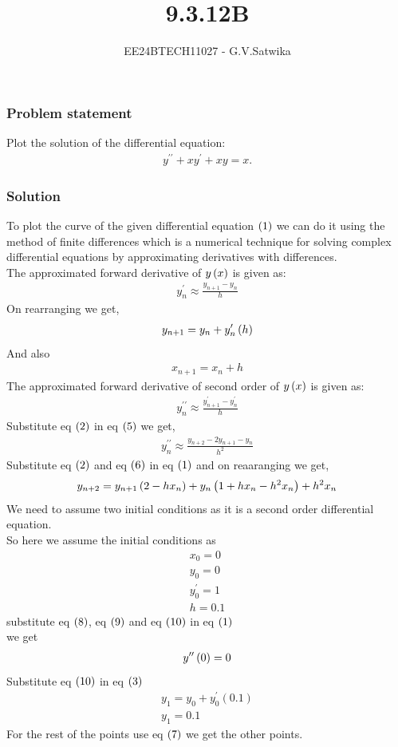 \documentclass{beamer}
\begin{document}
\title{9.3.12B}
\author{EE24BTECH11027 - G.V.Satwika}
\date{}
\frame{\titlepage}

\begin{frame}
\frametitle{Problem statement}
Plot the solution of the differential equation: 
\begin{align}
    y^{\prime\prime} +xy^\prime + xy = x. 
\end{align}
\end{frame}
\begin{frame}[allowframebreaks]
\frametitle{Solution}
To plot the curve of the given differential equation $\left(1\right)$ we can do it using the method of finite differences which is a numerical technique for solving complex differential equations by approximating derivatives with differences.\\
The approximated forward derivative of $y\left(x\right)$ is given as:\\
\begin{align}
    y^\prime_n\approx\frac{y_{n+1}-y_n}{h}
\end{align}
On rearranging we get,
\begin{align}
    y_{n+1}=y_n+y^\prime_n\left(h\right)
\end{align}
And also 
\begin{align}
    x_{n+1}=x_n+h
\end{align}
The approximated forward derivative of second order of $y\left(x\right)$ is given as:\\
\begin{align}
    y^{\prime\prime}_n\approx \frac{y^\prime_{n+1}-y^\prime_n}{h}
\end{align}
Substitute eq $\left(2\right)$ in eq $\left(5\right)$ we get,
\begin{align}
    y^{\prime\prime}_n\approx\frac{y_{n+2}-2y_{n+1}-y_n}{h^2}
\end{align}
Substitute  eq $\left(2\right)$ and eq $\left(6\right)$ in eq $\left(1\right)$ and on reaaranging we get,
\begin{align}
    y_{n+2}=y_{n+1}\left(2-hx_n\right) +y_n\left(1+hx_n-h^2x_n\right)+h^2x_n
\end{align}
We need to assume two initial conditions as it is a second order differential equation. \\So here we assume the initial conditions as 
\begin{align}
    x_0=0\\y_0=0\\y^\prime_0=1\\h=0.1
\end{align}
substitute eq $\left(8\right)$, eq $\left(9\right)$ and eq $\left(10\right)$ in eq $\left(1\right)$\\ we get 
\begin{align}
    y^{\prime\prime}\left(0\right)=0
\end{align}
Substitute eq $\left(10\right)$ in eq $\left(3\right)$
\begin{align}
    y_1=y_0+y^\prime_0(0.1)\\
    y_1=0.1
\end{align}
For the rest of the points use eq $\left(7\right)$ we get the other points.
\end{frame}
\end{document}
